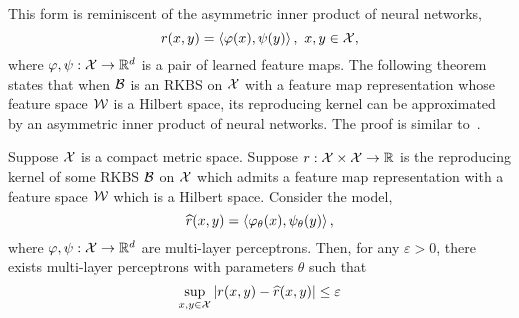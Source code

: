 This form is reminiscent of the asymmetric inner product of neural networks,
\begin{equation}
    r(x, y) = \iprod{\phi(x)}{\psi(y)}, \ x, y \in \calX,
\end{equation}
where $\varphi, \psi: {\mathcal{X}} \to \mathbb{R}^{d}$ is a pair of learned feature maps. The following theorem states that when ${\mathcal{B}}$ is an RKBS on ${\mathcal{X}}$ with a feature map representation whose feature space ${\mathcal{W}}$ is a Hilbert space, its reproducing kernel can be approximated by an asymmetric inner product of neural networks. The proof is similar to~.

\begin{theorem}\label{thm:asymmetric_inner_prod_approximates_rkbs}
   Suppose ${\mathcal{X}}$ is a compact metric space. Suppose $r: {\mathcal{X}} \times {\mathcal{X}} \to \mathbb{R}$ is the reproducing kernel of some RKBS ${\mathcal{B}}$ on ${\mathcal{X}}$ which admits a feature map representation with a feature space ${\mathcal{W}}$ which is a Hilbert space. Consider the model,
   \begin{equation}
    \hat{r}(x, y) = \iprod{\phi_\theta(x)}{\psi_\theta(y)},
   \end{equation}
    where $\varphi, \psi: {\mathcal{X}} \to \mathbb{R}^{d}$ are multi-layer perceptrons. Then, for any $\varepsilon > 0$, there exists multi-layer perceptrons with parameters $\theta$ such that
   \begin{equation*}
        \sup_{x,y \in \calX} \abs{r(x, y) - \hat{r}(x, y)} \leq \varepsilon
   \end{equation*}
\end{theorem}

